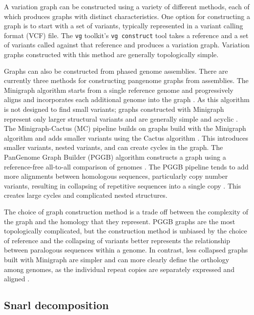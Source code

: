 \documentclass[11pt]{ucscthesis}
\begin{document}
A variation graph can be constructed using a variety of different methods, each of which produces graphs with distinct characteristics.
One option for constructing a graph is to start with a set of variants, typically represented in a variant calling format (VCF) file.
The \texttt{vg} toolkit's \texttt{vg construct} tool takes a reference and a set of variants called against that reference and produces a variation graph.
Variation graphs constructed with this method are generally topologically simple. 

Graphs can also be constructed from phased genome assemblies.
There are currently three methods for constructing pangenome graphs from assemblies.
The Minigraph algorithm starts from a single reference genome and progressively aligns and incorporates each additional genome into the graph \cite{li_minigraph_2020}.
As this algorithm is not designed to find small variants; graphs constructed with Minigraph represent only larger structural variants and are generally simple and acyclic \cite{li_minigraph_2020}.
The Minigraph-Cactus (MC) pipeline builds on graphs build with the Minigraph algorithm and adds smaller variants using the Cactus algorithm \cite{minigraph_cactus_2024}. 
This introduces smaller variants, nested variants, and can create cycles in the graph.
The PanGenome Graph Builder (PGGB) algorithm constructs a graph using a reference-free all-to-all comparison of genomes \cite{pggb_2024}.
The PGGB pipeline tends to add more alignments between homologous sequences, particularly copy number variants, resulting in collapsing of repetitive sequences into a single copy \cite{hprc_pangenome_2023}.
This creates large cycles and complicated nested structures.

The choice of graph construction method is a trade off between the complexity of the graph and the homology that they represent.
PGGB graphs are the most topologically complicated, but the construction method is unbiased by the choice of reference and the collapsing of variants better represents the relationship between paralogous sequences within a genome.
In contrast, less collapsed graphs built with Minigraph are simpler and can more clearly define the orthology among genomes, as the individual repeat copies are separately expressed and aligned \cite{li_minigraph_2020}. 


\subsection{Snarl decomposition}
\end{document}
